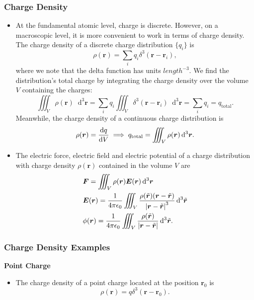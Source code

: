 \documentclass[11pt, a4paper]{article}
\newcommand{\diff}{\mathop{}\!\mathrm{d}} %
\newcommand{\dr}{\diff^{3} \r}  %
\newcommand{\dtr}{\diff^{3} \tilde{\r}}  %
\renewcommand{\vec}[1]{\bm{#1}} %
\renewcommand{\t}[1]{\tilde{#1}} %
\renewcommand{\r}{\vec{r}}
\newcommand{\E}{\vec{E}} %
\newcommand{\ee}{\epsilon_{0}}  %
\begin{document}
\subsubsection{Charge Density}
\begin{itemize}
	\item At the fundamental atomic level, charge is discrete. However, on a macroscopic level, it is more convenient to work in terms of charge density. The charge density of a discrete charge distribution $ \{q_{i}\} $ is
	\begin{equation*}
		\rho (\r) = \sum_{i} q_{i}\delta^{3}(\r - \r_{i}),
	\end{equation*}
	where we note that the delta function has units $ \si{length^{-3}} $. We find the distribution's total charge by integrating the charge density over the volume $ V $ containing the charges:
	\begin{equation*}
		\iiint_{V} \rho(\r) \dr  = \sum_{i} q_{i}\iiint_{V} \delta^{3}(\r - \r_{i})\dr = \sum_{i} q_{i} = q_{\text{total}}.
	\end{equation*}
	Meanwhile, the charge density of a continuous charge distribution is
	\begin{equation*}
		\rho(\r) = \dv{q}{V} \implies q_{\text{total}} = \iiint_{V} \rho(\r) \dr.
	\end{equation*}
	
	\item The electric force, electric field and electric potential of a charge distribution with charge density $ \rho(\r) $  contained in the volume $ V $ are
	\begin{align*}
		& \vec{F} = \iiint_{V} \rho(\r) \E(\r) \dr \\
		& \E(\r) = \frac{1}{4\pi \ee} \iiint_{V}\frac{\rho(\t{\r})(\r - \t{\r})}{\abs{\r - \t{\r}}^{3}} \dtr\\
		& \phi (\r) = \frac{1}{4\pi \ee}\iiint_{V}\frac{\rho(\t{\r})}{\abs{\r - \t{\r}}}\dtr.
	\end{align*}
\end{itemize}

\subsubsection{Charge Density Examples}

\vspace{2mm}
\textbf{Point Charge} 
\begin{itemize}
	\item The charge density of a point charge located at the position $ \r_{0} $ is
	\begin{equation*}
		\rho (\r) = q \delta^{3}(\r - \r_{0}).
	\end{equation*}
\end{itemize}	
	
\end{document}
